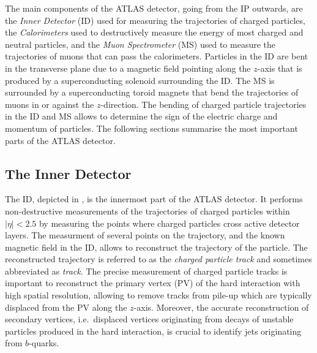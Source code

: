 The main components of the ATLAS detector, going from the IP outwards, are the
\emph{Inner Detector} (ID) used for measuring the trajectories of charged
particles, the \emph{Calorimeters} used to destructively measure the energy of
most charged and neutral particles, and the \emph{Muon Spectrometer} (MS) used
to measure the trajectories of muons that can pass the calorimeters. Particles
in the ID are bent in the transverse plane due to a magnetic
field pointing along the $z$-axis that is produced by a
superconducting solenoid surrounding the ID.  The MS is surrounded by a
superconducting toroid magnets that bend the trajectories of muons in or against
the $z$-direction. The bending of charged particle trajectories in the ID and MS
allows to determine the sign of the electric charge and momentum of
particles. The following sections summarise the most important parts of the
ATLAS detector.


\subsection{The Inner Detector}

The ID, depicted in , is the innermost part of
the ATLAS detector. It performs non-destructive measurements of the trajectories
of charged particles within $|\eta| < 2.5$ by measuring the points where charged
particles cross active detector layers. The measurment of several points on the
trajectory, and the known magnetic field in the ID, allows to reconstruct the
trajectory of the particle. The reconstructed trajectory is referred to as the
\emph{charged particle track} and sometimes abbreviated as \emph{track}. The
precise measurement of charged particle tracks is important to reconstruct the
primary vertex (PV) of the hard interaction with high spatial resolution,
allowing to remove tracks from pile-up which are typically displaced from the PV
along the $z$-axis. Moreover, the accurate reconstruction of secondary vertices,
i.e.\ displaced vertices originating from decays of unstable particles produced
in the hard interaction, is crucial to identify jets originating from
$b$-quarks.%


